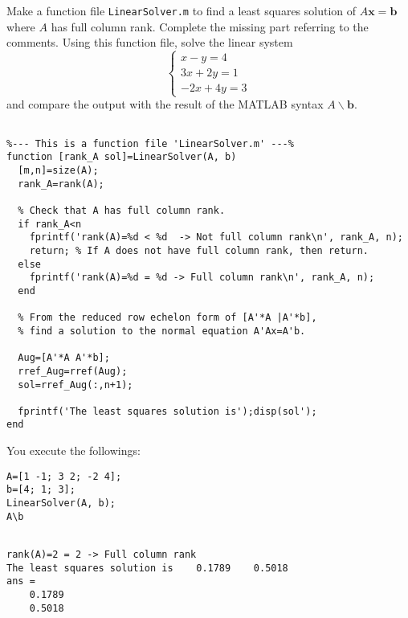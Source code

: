 \begin{exer}
Make a function file \verb"LinearSolver.m" to find a least squares solution of $A\mathbf{x}=\mathbf{b}$ where $A$ has full column rank. Complete the missing part referring to the comments. Using this function file, solve the linear system
$$\begin{cases}
x-y=4\\
3x+2y=1\\
-2x+4y=3
\end{cases}
$$
and compare the output with the result of the MATLAB syntax $A\backslash \mathbf{b}$.
\end{exer}


\begin{sol}

\begin{verbatim}

%--- This is a function file 'LinearSolver.m' ---%
function [rank_A sol]=LinearSolver(A, b)
  [m,n]=size(A);
  rank_A=rank(A);
    
  % Check that A has full column rank.   
  if rank_A<n
    fprintf('rank(A)=%d < %d  -> Not full column rank\n', rank_A, n);
    return; % If A does not have full column rank, then return.
  else 
    fprintf('rank(A)=%d = %d -> Full column rank\n', rank_A, n);
  end
   
  % From the reduced row echelon form of [A'*A |A'*b],
  % find a solution to the normal equation A'Ax=A'b.

  Aug=[A'*A A'*b]; 
  rref_Aug=rref(Aug);
  sol=rref_Aug(:,n+1);
  
  fprintf('The least squares solution is');disp(sol');
end
\end{verbatim}

You execute the followings:
\begin{verbatim}
A=[1 -1; 3 2; -2 4];   
b=[4; 1; 3];
LinearSolver(A, b);
A\b
\end{verbatim}

\begin{outputs}
\begin{verbatim}

rank(A)=2 = 2 -> Full column rank
The least squares solution is    0.1789    0.5018
ans =
    0.1789
    0.5018
\end{verbatim}

\end{outputs}

\end{sol}

\vspace{3mm}

